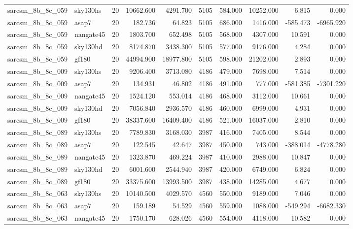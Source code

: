 \documentclass{article}
\begin{document}
\begin{longtable}{llrrrrrrrr}
sarcsm\_8b\_8c\_059 & sky130hs & 20 & 10662.600 & 4291.700 & 5105 & 584.000 & 10252.000 & 6.815 & 0.000 \\
sarcsm\_8b\_8c\_059 & asap7 & 20 & 182.736 & 64.823 & 5105 & 686.000 & 1416.000 & -585.473 & -6965.920 \\
sarcsm\_8b\_8c\_059 & nangate45 & 20 & 1803.700 & 652.498 & 5105 & 568.000 & 4307.000 & 10.591 & 0.000 \\
sarcsm\_8b\_8c\_059 & sky130hd & 20 & 8174.870 & 3438.300 & 5105 & 577.000 & 9176.000 & 4.284 & 0.000 \\
sarcsm\_8b\_8c\_059 & gf180 & 20 & 44994.900 & 18977.800 & 5105 & 598.000 & 21202.000 & 2.893 & 0.000 \\
sarcsm\_8b\_8c\_009 & sky130hs & 20 & 9206.400 & 3713.080 & 4186 & 479.000 & 7698.000 & 7.514 & 0.000 \\
sarcsm\_8b\_8c\_009 & asap7 & 20 & 134.931 & 46.802 & 4186 & 491.000 & 777.000 & -581.385 & -7301.220 \\
sarcsm\_8b\_8c\_009 & nangate45 & 20 & 1524.120 & 553.014 & 4186 & 468.000 & 3112.000 & 10.661 & 0.000 \\
sarcsm\_8b\_8c\_009 & sky130hd & 20 & 7056.840 & 2936.570 & 4186 & 460.000 & 6999.000 & 4.931 & 0.000 \\
sarcsm\_8b\_8c\_009 & gf180 & 20 & 38337.600 & 16409.400 & 4186 & 521.000 & 16037.000 & 2.810 & 0.000 \\
sarcsm\_8b\_8c\_089 & sky130hs & 20 & 7789.830 & 3168.030 & 3987 & 416.000 & 7405.000 & 8.544 & 0.000 \\
sarcsm\_8b\_8c\_089 & asap7 & 20 & 122.545 & 42.647 & 3987 & 450.000 & 743.000 & -388.014 & -4778.280 \\
sarcsm\_8b\_8c\_089 & nangate45 & 20 & 1323.870 & 469.224 & 3987 & 410.000 & 2988.000 & 10.847 & 0.000 \\
sarcsm\_8b\_8c\_089 & sky130hd & 20 & 6001.600 & 2544.940 & 3987 & 420.000 & 6749.000 & 6.824 & 0.000 \\
sarcsm\_8b\_8c\_089 & gf180 & 20 & 33375.600 & 13993.500 & 3987 & 438.000 & 14285.000 & 4.677 & 0.000 \\
sarcsm\_8b\_8c\_063 & sky130hs & 20 & 10140.500 & 4029.570 & 4560 & 550.000 & 9189.000 & 7.046 & 0.000 \\
sarcsm\_8b\_8c\_063 & asap7 & 20 & 159.189 & 54.529 & 4560 & 559.000 & 1088.000 & -549.294 & -6682.330 \\
sarcsm\_8b\_8c\_063 & nangate45 & 20 & 1750.170 & 628.026 & 4560 & 554.000 & 4118.000 & 10.582 & 0.000 \\

\end{longtable}
\end{document}
